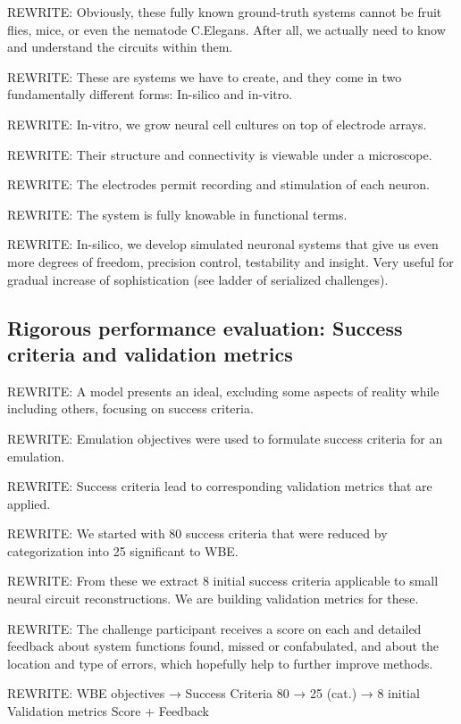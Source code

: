 \documentclass{ldr-article}
\begin{document}
\alert{REWRITE:} Obviously, these fully known ground-truth systems cannot be fruit flies, mice, or even the nematode C.Elegans. After all, we actually need to know and understand the circuits within them.

\alert{REWRITE:} These are systems we have to create, and they come in two fundamentally different forms: In-silico and in-vitro.

\alert{REWRITE:} In-vitro, we grow neural cell cultures on top of electrode arrays.

\alert{REWRITE:} Their structure and connectivity is viewable under a microscope.

\alert{REWRITE:} The electrodes permit recording and stimulation of each neuron.

\alert{REWRITE:} The system is fully knowable in functional terms.

\alert{REWRITE:} In-silico, we develop simulated neuronal systems that give us even more degrees of freedom, precision control, testability and insight. Very useful for gradual increase of sophistication (see ladder of serialized challenges).

\subsection{Rigorous performance evaluation: Success criteria and validation metrics}

\alert{REWRITE:} A model presents an ideal, excluding some aspects of reality while including others, focusing on success criteria.

\alert{REWRITE:} Emulation objectives were used to formulate success criteria for an emulation.

\alert{REWRITE:} Success criteria lead to corresponding validation metrics that are applied.

\alert{REWRITE:} We started with 80 success criteria that were reduced by categorization into 25 significant to WBE.

\alert{REWRITE:} From these we extract 8 initial success criteria applicable to small neural circuit reconstructions. We are building validation metrics for these.

\alert{REWRITE:} The challenge participant receives a score on each and detailed feedback about system functions found, missed or confabulated, and about the location and type of errors, which hopefully help to further improve methods.

\alert{REWRITE:} WBE objectives → Success Criteria
80 → 25 (cat.) → 8 initial
Validation metrics
Score + Feedback
\end{document}
